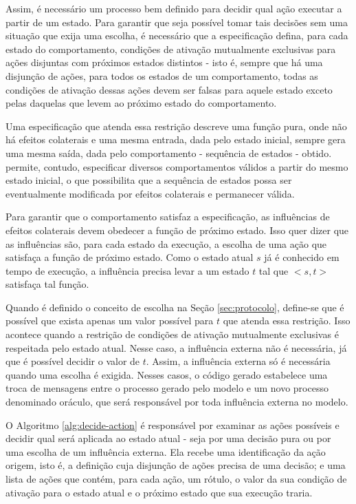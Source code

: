 Assim, é necessário um processo bem definido para decidir qual ação executar a
partir de um estado. Para garantir que seja possível tomar tais decisões sem uma
situação que exija uma escolha, é
necessário que a especificação defina, para cada estado do comportamento, condições de ativação mutualmente
exclusivas para ações disjuntas com próximos estados distintos - isto é,
sempre que há uma disjunção de ações, para todos os estados de um comportamento,
todas as condições de ativação dessas ações devem ser falsas para aquele estado exceto pelas daquelas
que levem ao próximo estado do comportamento.

Uma especificação que atenda essa restrição descreve uma função pura, onde não
há efeitos colaterais e uma mesma entrada, dada pelo estado inicial, sempre gera uma mesma
saída, dada pelo comportamento - sequência de estados - obtido. \TLA permite,
contudo, especificar diversos comportamentos válidos a partir do mesmo estado
inicial, o que possibilita que a sequência de estados possa ser eventualmente modificada por
efeitos colaterais e permanecer válida.

Para garantir que o comportamento satisfaz a especificação, as influências de
efeitos colaterais devem obedecer a função de próximo estado. Isso quer dizer
que as influências são, para cada estado da execução, a escolha de uma ação que
satisfaça a função de próximo estado. Como o estado atual $s$ já é conhecido em
tempo de execução, a influência precisa levar a um estado $t$ tal que $<s,t>$
satisfaça tal função.

Quando é definido o conceito de escolha na Seção \ref{sec:protocolo}, define-se que é possível
que exista apenas um valor possível para $t$ que atenda essa restrição. Isso acontece quando a restrição
de condições de ativação mutualmente exclusivas é respeitada pelo estado atual.
Nesse caso, a influência externa não é necessária, já que é possível decidir o
valor de $t$. Assim, a influência externa só é necessária quando uma escolha é
exigida. Nesses casos, o código gerado estabelece uma troca de mensagens entre o
processo gerado pelo modelo e um novo processo denominado oráculo, que será
responsável por toda influência externa no modelo.

O Algoritmo \ref{alg:decide-action} é responsável por examinar as ações
possíveis e decidir qual será aplicada ao estado atual - seja por uma decisão
pura ou por uma escolha de um influência externa. Ela recebe uma identificação
da ação origem, isto é, a definição cuja disjunção de ações precisa de uma
decisão; e uma lista de ações que contém, para cada ação, um rótulo, o valor da
sua condição de ativação para o estado atual e o próximo estado que sua execução traria.

